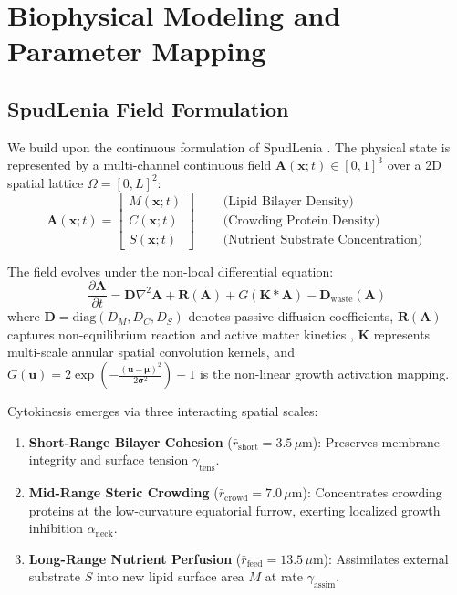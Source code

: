 \documentclass[letterpaper]{article}
\begin{document}
\section{Biophysical Modeling and Parameter Mapping}

\subsection{SpudLenia Field Formulation}

We build upon the continuous formulation of SpudLenia \citep{oduniyi2026spudlenia}. The physical state is represented by a multi-channel continuous field $\mathbf{A}(\mathbf{x}; t) \in [0, 1]^3$ over a 2D spatial lattice $\Omega = [0, L]^2$:
\begin{equation}
\mathbf{A}(\mathbf{x}; t) = \begin{bmatrix} M(\mathbf{x}; t) \\ C(\mathbf{x}; t) \\ S(\mathbf{x}; t) \end{bmatrix} \quad \begin{aligned} &\text{(Lipid Bilayer Density)} \\ &\text{(Crowding Protein Density)} \\ &\text{(Nutrient Substrate Concentration)} \end{aligned}
\end{equation}

The field evolves under the non-local differential equation:
\begin{equation}
\frac{\partial \mathbf{A}}{\partial t} = \mathbf{D} \nabla^2 \mathbf{A} + \mathbf{R}(\mathbf{A}) + G\left( \mathbf{K} * \mathbf{A} \right) - \mathbf{D}_{\text{waste}}(\mathbf{A})
\end{equation}
where $\mathbf{D} = \text{diag}(D_M, D_C, D_S)$ denotes passive diffusion coefficients, $\mathbf{R}(\mathbf{A})$ captures non-equilibrium reaction and active matter kinetics \citep{turing1952chemical,marchetti2013hydrodynamics}, $\mathbf{K}$ represents multi-scale annular spatial convolution kernels, and $G(\mathbf{u}) = 2 \exp\left(-\frac{(\mathbf{u} - \boldsymbol{\mu})^2}{2\boldsymbol{\sigma}^2}\right) - 1$ is the non-linear growth activation mapping.

Cytokinesis emerges via three interacting spatial scales:
\begin{enumerate}
    \item \textbf{Short-Range Bilayer Cohesion} ($\bar{r}_{\text{short}} = 3.5\,\mu\text{m}$): Preserves membrane integrity and surface tension $\gamma_{\text{tens}}$.
    \item \textbf{Mid-Range Steric Crowding} ($\bar{r}_{\text{crowd}} = 7.0\,\mu\text{m}$): Concentrates crowding proteins at the low-curvature equatorial furrow, exerting localized growth inhibition $\alpha_{\text{neck}}$.
    \item \textbf{Long-Range Nutrient Perfusion} ($\bar{r}_{\text{feed}} = 13.5\,\mu\text{m}$): Assimilates external substrate $S$ into new lipid surface area $M$ at rate $\gamma_{\text{assim}}$.
\end{enumerate}
\end{document}

